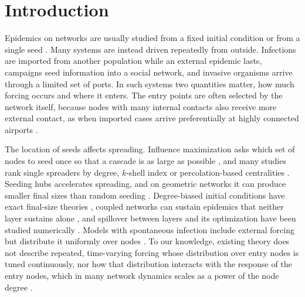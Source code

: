 \documentclass[pre,twocolumn,superscriptaddress,amsmath,amssymb,floatfix]{revtex4-2}
\begin{document}
\section{Introduction}
Epidemics on networks are usually studied from a fixed initial condition or
from a single seed \cite{newman2002spread,kenah2007second,pastorsatorras2015epidemic}.
Many systems are instead driven repeatedly from outside. Infections are
imported from another population while an external epidemic lasts, campaigns
seed information into a social network, and invasive organisms arrive through a
limited set of ports. In such systems two quantities matter, how much forcing
occurs and where it enters. The entry points are often selected by the network
itself, because nodes with many internal contacts also receive more external
contact, as when imported cases arrive preferentially at highly connected
airports \cite{colizza2006role}.

The location of seeds affects spreading. Influence maximization asks which set
of nodes to seed once so that a cascade is as large as possible
\cite{kempe2003maximizing,morone2015influence}, and many studies rank single
spreaders by degree, $k$-shell index or percolation-based centralities
\cite{kitsak2010identification,radicchi2016leveraging,lu2016vital,erkol2019systematic}.
Seeding hubs accelerates spreading, and on geometric networks it can produce
smaller final sizes than random seeding \cite{odor2021switchover}.
Degree-biased initial conditions have exact final-size theories
\cite{miller2014epidemics}, coupled networks can sustain epidemics that neither
layer sustains alone \cite{saumell2012epidemic,dickison2012epidemics}, and
spillover between layers and its optimization have been studied numerically
\cite{das2024sir,pan2019optimizing}. Models with spontaneous infection include
external forcing but distribute it uniformly over nodes
\cite{vanmieghem2012epidemics}. To our knowledge, existing theory does not
describe repeated, time-varying forcing whose distribution over entry nodes is
tuned continuously, nor how that
distribution interacts with the response of the entry nodes, which in many
network dynamics scales as a power of the node degree
\cite{barzel2013universality,hens2019spatiotemporal}.
\end{document}
